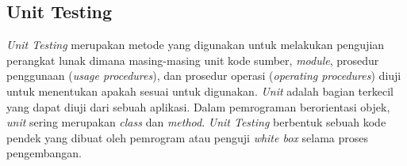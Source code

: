 \begin{spacing}{2}
  \subsection{Unit Testing}
    \emph{Unit Testing} merupakan metode yang digunakan untuk melakukan pengujian perangkat lunak dimana masing-masing unit kode sumber, \emph{module}, prosedur penggunaan (\emph{usage procedures}), dan prosedur operasi (\emph{operating procedures}) diuji untuk menentukan apakah sesuai untuk digunakan. \emph{Unit} adalah bagian terkecil yang dapat diuji dari sebuah aplikasi. Dalam pemrograman berorientasi objek, \emph{unit} sering merupakan \emph{class} dan \emph{method}. \emph{Unit Testing} berbentuk sebuah kode pendek yang dibuat oleh pemrogram atau penguji \emph{white box} selama proses pengembangan.

\end{spacing}
\begin{comment}

\end{comment}
